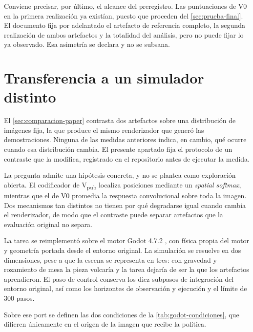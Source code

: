 Conviene precisar, por \'ultimo, el alcance del preregistro. Las puntuaciones de V0 en la
primera realizaci\'on ya exist\'ian, puesto que proceden del \cref{sec:prueba-final}. El
documento fija por adelantado el artefacto de referencia completo, la segunda realizaci\'on
de ambos artefactos y la totalidad del an\'alisis, pero no puede fijar lo ya observado. Esa
asimetr\'ia se declara y no se subsana.

\section{Transferencia a un simulador distinto}
\label{sec:transferencia-godot}

El \cref{sec:comparacion-paper} contrasta dos artefactos sobre una distribuci\'on de
im\'agenes fija, la que produce el mismo renderizador que gener\'o las demostraciones.
Ninguna de las medidas anteriores indica, en cambio, qu\'e ocurre cuando esa distribuci\'on
cambia. El presente apartado fija el protocolo de un contraste que la modifica, registrado
en el repositorio antes de ejecutar la medida.

La pregunta admite una hip\'otesis concreta, y no se plantea como exploraci\'on abierta. El
codificador de V\textsubscript{pub} localiza posiciones mediante un \textit{spatial softmax},
mientras que el de V0 promedia la respuesta convolucional sobre toda la imagen. Dos
mecanismos tan distintos no tienen por qu\'e degradarse igual cuando cambia el renderizador,
de modo que el contraste puede separar artefactos que la evaluaci\'on original no separa.


La tarea se reimplement\'o sobre el motor Godot 4.7.2 \cite{linietsky2014godot}, con f\'isica propia del motor y
geometr\'ia portada desde el entorno original. La simulaci\'on se resuelve en dos
dimensiones, pese a que la escena se representa en tres: con gravedad y rozamiento de mesa
la pieza volcar\'ia y la tarea dejar\'ia de ser la que los artefactos aprendieron. El paso de
control conserva los diez subpasos de integraci\'on del entorno original, as\'i como los
horizontes de observaci\'on y ejecuci\'on y el l\'imite de \num{300} pasos.

Sobre ese port se definen las dos condiciones de la \cref{tab:godot-condiciones}, que
difieren \'unicamente en el origen de la imagen que recibe la pol\'itica.

